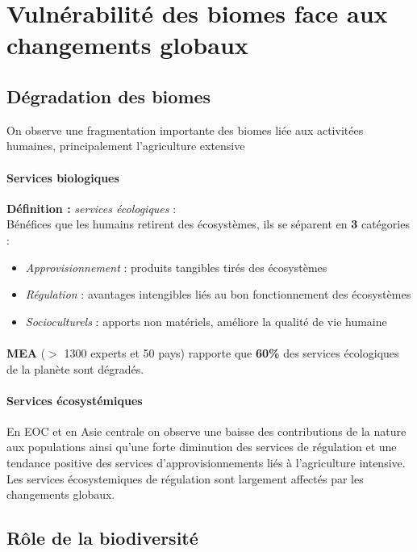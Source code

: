 \documentclass {article}
\begin{document}
\section{Vulnérabilité des biomes face aux changements globaux}

\subsection{Dégradation des biomes}

On observe une fragmentation importante des biomes liée aux activitées humaines, principalement l'agriculture extensive

\paragraph{Services biologiques}
\textbf{Définition :} \textit{services écologiques} :
\\ Bénéfices que les humains retirent des écosystèmes, ils se séparent en \textbf{3} catégories :
\\
\begin{itemize}
\item \textit{Approvisionnement} : produits tangibles tirés des écosystèmes
\item \textit{Régulation} : avantages intengibles liés au bon fonctionnement des écosystèmes
\item \textit{Socioculturels} : apports non matériels, améliore la qualité de vie humaine
\end{itemize}

\paragraph{}
\textbf{MEA} ($>$ 1300 experts et 50 pays) rapporte que \textbf{60\%} des services écologiques de la planète sont dégradés.

\paragraph{Services écosystémiques}
En EOC et en Asie centrale on observe une baisse des contributions de la nature aux populations ainsi qu'une forte diminution des services de régulation et une tendance positive des services d'approvisionnements liés à l'agriculture intensive.
Les services écosystemiques de régulation sont largement affectés par les changements globaux.

\subsection{Rôle de la biodiversité}
\end{document}
